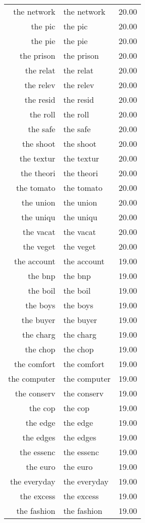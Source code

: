 \begin{table}[ht]
\begin{tabular}{rlr}
  the network & the network & 20.00 \\ 
  the pic & the pic & 20.00 \\ 
  the pie & the pie & 20.00 \\ 
  the prison & the prison & 20.00 \\ 
  the relat & the relat & 20.00 \\ 
  the relev & the relev & 20.00 \\ 
  the resid & the resid & 20.00 \\ 
  the roll & the roll & 20.00 \\ 
  the safe & the safe & 20.00 \\ 
  the shoot & the shoot & 20.00 \\ 
  the textur & the textur & 20.00 \\ 
  the theori & the theori & 20.00 \\ 
  the tomato & the tomato & 20.00 \\ 
  the union & the union & 20.00 \\ 
  the uniqu & the uniqu & 20.00 \\ 
  the vacat & the vacat & 20.00 \\ 
  the veget & the veget & 20.00 \\ 
  the account & the account & 19.00 \\ 
  the bnp & the bnp & 19.00 \\ 
  the boil & the boil & 19.00 \\ 
  the boys & the boys & 19.00 \\ 
  the buyer & the buyer & 19.00 \\ 
  the charg & the charg & 19.00 \\ 
  the chop & the chop & 19.00 \\ 
  the comfort & the comfort & 19.00 \\ 
  the computer & the computer & 19.00 \\ 
  the conserv & the conserv & 19.00 \\ 
  the cop & the cop & 19.00 \\ 
  the edge & the edge & 19.00 \\ 
  the edges & the edges & 19.00 \\ 
  the essenc & the essenc & 19.00 \\ 
  the euro & the euro & 19.00 \\ 
  the everyday & the everyday & 19.00 \\ 
  the excess & the excess & 19.00 \\ 
  the fashion & the fashion & 19.00 \\ 

\end{tabular}
\end{table}
